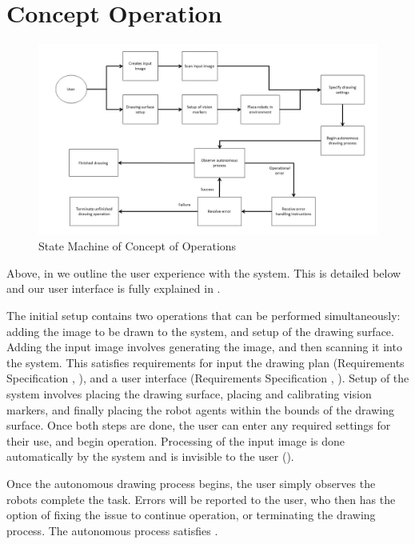 
\pagebreak
\section{Concept Operation}
\label{sec:concept_operation}

\begin{figure}[h!]
 \centering
  \includegraphics[width=0.90\columnwidth]{diagrams/concept_operation_user.jpg}
	\caption{State Machine of Concept of Operations}
 \label{fig:concept_operation}
\end{figure}

Above, in  we outline the user experience with the system. This is detailed below and our user interface is fully explained in .

The initial setup contains two operations that can be performed simultaneously: adding the image to be drawn to the system, and setup of the drawing surface. Adding the input image involves generating the image, and then scanning it into the system. This satisfies requirements for input the drawing plan (Requirements Specification , ), and a user interface (Requirements Specification , ). 
Setup of the system involves placing the drawing surface, placing and calibrating vision markers, and finally placing the robot agents within the bounds of the drawing surface. Once both steps are done, the user can enter any required settings for their use, and begin operation. Processing of the input image is done automatically by the system and is invisible to the user ().

Once the autonomous drawing process begins, the user simply observes the robots  complete the task. Errors will be reported to the user, who then has the option of fixing the issue to continue operation, or terminating the drawing process. The autonomous process satisfies .
